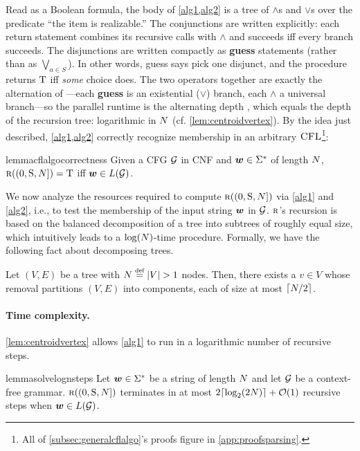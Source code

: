 \documentclass{article}
\begin{document}
Read as a Boolean formula, the body of \cref{alg1,alg2} is a tree of $\land$s and $\lor$s over the predicate ``the item is realizable.'' The conjunctions are written explicitly: each return statement combines its recursive calls with $\wedge$ and succeeds iff every branch succeeds. The disjunctions are written compactly as \textbf{guess} statements (rather than as $\bigvee_{a \in S}$).
In other words, guess says pick one disjunct, and the procedure returns ${\mathbin{\mathrm{T}}}$ iff \emph{some} choice does. 
The two operators together are exactly the alternation of \citet{chandra-alternation}---each \textbf{guess} is an existential ($\vee$) branch, each $\wedge$ a universal branch---so the parallel runtime is the alternating depth \citep{ruzzo-treesize, ruzzo-unif}, which equals the depth of the recursion tree: logarithmic in ${{ N}}$ (cf. \cref{lem:centroidvertex}).
By the idea just described, \cref{alg1,alg2} correctly recognize membership in an arbitrary ${\textsc{CFL}}$\footnote{All of \cref{subsec:generalcflalgo}'s proofs figure in \cref{app:proofsparsing}.}:
\begin{restatable}[Correctness]{lemma}{cflalgocorrectness}\label{lem:cfl_algo_correctness}
    Given a CFG ${{ \mathcal{G}}}$ in CNF and ${{\boldsymbol{w}}} \in {{{{ \Sigma}}^*}}$ of length ${{ N}}$, ${\textsc{r}}((0, {{ \mathrm{S}}}, {{ N}}]) = {\mathbin{\mathrm{T}}}$ iff ${{\boldsymbol{w}}} \in {L}({{ \mathcal{G}}})$.
\end{restatable}

We now analyze the resources required to compute ${\textsc{r}}((0, {{ \mathrm{S}}}, {{ N}}])$ via \cref{alg1} and \cref{alg2}, i.e., to test the membership of the input string ${{\boldsymbol{w}}}$ in ${{ \mathcal{G}}}$. 
${\textsc{r}}$'s recursion is based on the balanced decomposition of a tree into subtrees of roughly equal size, which intuitively leads to a $\log({{ N}})$-time procedure. 
Formally, we have the following fact about decomposing trees.
\begin{lemma}\label{lem:centroidvertex}
    Let $(V, E)$ be a tree with $\idxn \defeq |V| > 1$ nodes.
    Then, there exists a  $v \in V$ whose removal partitions $(V,E)$ into components, each of size at most $\lceil {{ N}}/2 \rceil$.
\end{lemma}

\paragraph{Time complexity.} 
\cref{lem:centroidvertex} allows \cref{alg1} to run in a logarithmic number of recursive steps.
\begin{restatable}{lemma}{solvelognsteps}\label{lem:solvelognsteps}
    Let ${{\boldsymbol{w}}} \in {{{{ \Sigma}}^*}}$ be a string of length ${{ N}}$ and let ${{ \mathcal{G}}}$ be a context-free grammar.
    ${\textsc{r}}((0, {{ \mathrm{S}}}, {{ N}}])$ terminates in at most $2\lceil \log_{2}(2{{ N}}) \rceil + {{ \mathcal{O}}}(1)$ recursive steps when ${{\boldsymbol{w}}}\in{L}({{ \mathcal{G}}})$.
\end{restatable}
\end{document}
